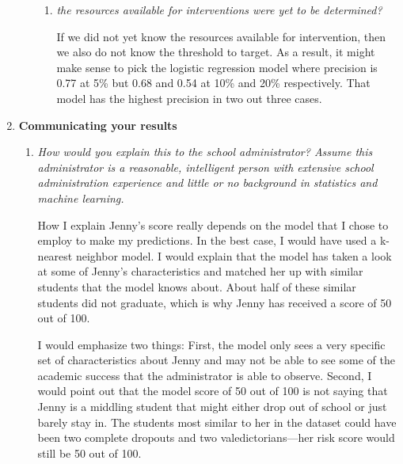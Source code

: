 \documentclass[11pt]{article}
\begin{document}
\begin{enumerate}
\begin{enumerate}
\begin{enumerate}
                    \item \textit{the resources available for interventions
                        were yet to be determined?}

                        If we did not yet know the resources available for
                        intervention, then we also do not know the threshold to
                        target. As a result, it might make sense to pick the
                        logistic regression model where precision is 0.77 at
                        5\% but 0.68 and 0.54 at 10\% and 20\% respectively.
                        That model has the highest precision in two out three
                        cases.
                \end{enumerate}
        \end{enumerate}

    \item \textbf{Communicating your results}
        \begin{enumerate}
            \item \textit{How would you explain this to the school
                administrator? Assume this administrator is a reasonable,
                intelligent person with extensive school administration
                experience and little or no background in statistics and
                machine learning.}

                How I explain Jenny's score really depends on the model that I
                chose to employ to make my predictions. In the best case, I
                would have used a k-nearest neighbor model. I would explain
                that the model has taken a look at some of Jenny's
                characteristics and matched her up with similar students that
                the model knows about. About half of these similar students did
                not graduate, which is why Jenny has received a score of 50 out
                of 100.

                I would emphasize two things: First, the model only sees a very
                specific set of characteristics about Jenny and may not be able
                to see some of the academic success that the administrator is
                able to observe. Second, I would point out that the model score
                of 50 out of 100 is not saying that Jenny is a middling student
                that might either drop out of school or just barely stay in.
                The students most similar to her in the dataset could have been
                two complete dropouts and two valedictorians---her risk score
                would still be 50 out of 100.


\end{enumerate}
\end{enumerate}
\end{document}
